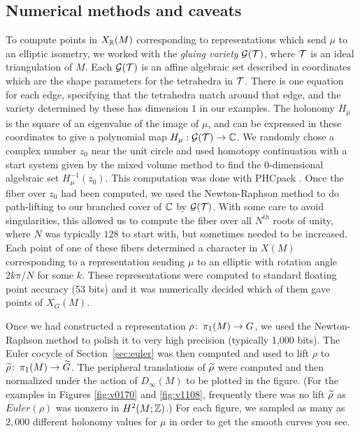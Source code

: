 \documentclass[tikz, sepfignums, defaultenums]{nmd/article}
\newcommand{\XG}[1]{\mathit{X}_{G}\left(#1\right)}
\newcommand{\SymTEL}[1]{D_\infty\left(#1\right)}
\newcommand{\euler}[1]{\mathit{Euler}\left(#1\right)}
\begin{document}
\subsection{Numerical methods and caveats}

To compute points in $X_{\mathbb R}(M)$ corresponding to representations which
send $\mu$ to an elliptic isometry, we worked with the \emph{gluing
  variety} ${\mathcal G}({\mathcal T})$, where ${\mathcal T}$ is an ideal triangulation of
$M$. Each ${\mathcal G}({\mathcal T})$ is an affine algebraic set described in
coordinates which are the shape parameters for the tetrahedra in
${\mathcal T}$. There is one equation for each edge, specifying that the
tetrahedra match around that edge, and the variety determined by these
has dimension $1$ in our examples.  The holonomy $H_\mu$ is the
square of an eigenvalue of the image of $\mu$, and can be expressed in
these coordinates to give a polynomial map $H_\mu:{\mathcal G}({\mathcal T})\to{\mathbb C}$.
We randomly chose a complex number $z_0$ near the unit circle and used
homotopy continuation with a start system given by the mixed volume
method to find the $0$-dimensional algebraic set $H_\mu^{-1}(z_0)$.
This computation was done with PHCpack \cite{Verschelde1999,
  PHCpack}. Once the fiber over $z_0$ had been computed, we used the
Newton-Raphson method to do path-lifting to our branched cover of ${\mathbb C}$
by ${\mathcal G}({\mathcal T})$.  With some care to avoid singularities, this allowed us
to compute the fiber over all $N^{\mathit{th}}$ roots of unity, where
$N$ was typically $128$ to start with, but sometimes needed to be
increased.  Each point of one of these fibers determined a character
in $X(M)$ corresponding to a representation sending $\mu$ to an
elliptic with rotation angle $2k\pi/N$ for some $k$.  These
representations were computed to standard floating point accuracy (53
bits) and it was numerically decided which of them gave points of
$\XG{M}$.
 
Once we had constructed a representation $\rho \colon\thinspace \pi_1(M) \to G$,
we used the Newton\hyp Raphson method to polish it to very high
precision (typically 1{,}000 bits).  The Euler cocycle of
Section~\ref{sec:euler} was then computed and used to lift $\rho$ to
$\rhotil \maps \pi_1(M) \to \Gtil$. The peripheral translations of
$\rhotil$ were computed and then normalized under the action of
$\SymTEL{M}$ to be plotted in the figure.  (For the examples in
Figures \ref{fig:v0170} and \ref{fig:v1108}, frequently there was no
lift $\rhotil$ as $\euler{\rho}$ was nonzero in $H^2(M; {\mathbb Z})$.)  For
each figure, we sampled as many as $2{,}000$ different holonomy values
for $\mu$ in order to get the smooth curves you see.
\end{document}
